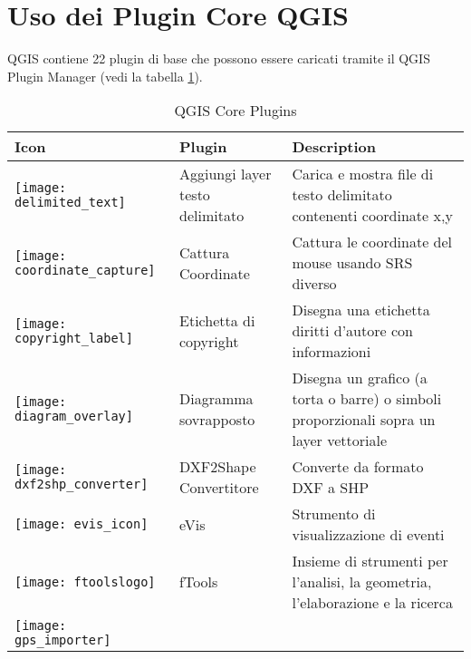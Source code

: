 
\section{Uso dei Plugin Core QGIS}\label{sec:core_plugins}


QGIS \CURRENT contiene 22 plugin di base che possono essere caricati tramite
il QGIS Plugin Manager (vedi la tabella \ref{tab:core_plugins}).

\begin{minipage}{\textwidth}
\begin{table}[H]
\centering
\caption{QGIS Core Plugins}\label{tab:core_plugins}\medskip
\small
 \begin{tabular}{|l|l|p{4in}|}
\hline \textbf{Icon} & \textbf{Plugin} & \textbf{Description}\\
\hline
\texttt{[image: delimited\_text]}
 & Aggiungi layer testo delimitato \index{plugin!testo delimitato} & Carica e mostra file di testo delimitato contenenti coordinate x,y\\
\hline
\texttt{[image: coordinate\_capture]}
 & Cattura Coordinate \index{plugin!cattura coordinate}& Cattura le coordinate del mouse
usando SRS diverso\\
\hline 
\texttt{[image: copyright\_label]}
 & Etichetta di copyright \index{plugin!etichetta diritti d'autore}& Disegna una etichetta diritti d'autore con informazioni\\
\hline 
\texttt{[image: diagram\_overlay]}
 & Diagramma sovrapposto \index{plugins!diagramma}& Disegna un grafico (a torta o barre) o simboli proporzionali sopra un layer vettoriale\\
\hline
\texttt{[image: dxf2shp\_converter]}
 & DXF2Shape Convertitore \index{plugin!convertitore DXF2Shape}& Converte da formato DXF a SHP\\
\hline
\texttt{[image: evis\_icon]}
 & eVis & Strumento di visualizzazione di eventi \\
\hline
\texttt{[image: ftoolslogo]}
 & fTools \index{plugins!ftools}& Insieme di strumenti per l'analisi, la geometria, l'elaborazione e la ricerca\\
\hline
\texttt{[image: gps\_importer]}

\end{tabular}
\end{table}
\end{minipage}
